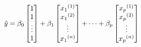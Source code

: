 \documentclass[preview]{standalone}
\begin{document}
\begin{align*}
\special{dvisvgm:raw <g id='unique000'>}\hat{y}=\beta_0\begin{bmatrix}1\\1\\\vdots\\1\end{bmatrix}+\beta_1\begin{bmatrix}{x_1}^{(1)}\\{x_1}^{(2)}\\\vdots\\{x_1}^{(n)}\end{bmatrix}+\cdots+\beta_p\begin{bmatrix}{x_p}^{(1)}\\{x_p}^{(2)}\\\vdots\\{x_p}^{(n)}\end{bmatrix}\special{dvisvgm:raw </g>}
\end{align*}
\end{document}
